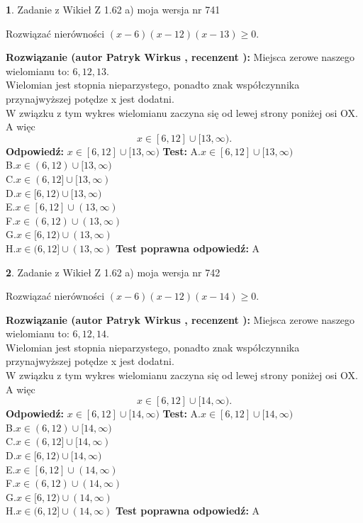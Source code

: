 \documentclass[12pt, a4paper]{article}
\theoremstyle{definition} %
\newtheorem{zad}{}
\newcommand{\zadStart}[1]{\begin{zad}#1\newline}
\newcommand{\zadStop}{\end{zad}}
\newcommand{\rozwStart}[2]{\noindent \textbf{Rozwiązanie (autor #1 , recenzent #2): }\newline}
\newcommand{\rozwStop}{\newline}
\newcommand{\odpStart}{\noindent \textbf{Odpowiedź:}\newline}
\newcommand{\odpStop}{\newline}
\newcommand{\testStart}{\noindent \textbf{Test:}\newline}
\newcommand{\testStop}{\newline}
\newcommand{\kluczStart}{\noindent \textbf{Test poprawna odpowiedź:}\newline}
\newcommand{\kluczStop}{\newline}
\begin{document}
\zadStart{Zadanie z Wikieł Z 1.62 a) moja wersja nr 741}

Rozwiązać nierówności $(x-6)(x-12)(x-13)\ge0$.
\zadStop
\rozwStart{Patryk Wirkus}{}
Miejsca zerowe naszego wielomianu to: $6, 12, 13$.\\
Wielomian jest stopnia nieparzystego, ponadto znak współczynnika przy\linebreak najwyższej potędze x jest dodatni.\\ W związku z tym wykres wielomianu zaczyna się od lewej strony poniżej osi OX. A więc $$x \in [6,12] \cup [13,\infty).$$
\rozwStop
\odpStart
$x \in [6,12] \cup [13,\infty)$
\odpStop
\testStart
A.$x \in [6,12] \cup [13,\infty)$\\
B.$x \in (6,12) \cup [13,\infty)$\\
C.$x \in (6,12] \cup [13,\infty)$\\
D.$x \in [6,12) \cup [13,\infty)$\\
E.$x \in [6,12] \cup (13,\infty)$\\
F.$x \in (6,12) \cup (13,\infty)$\\
G.$x \in [6,12) \cup (13,\infty)$\\
H.$x \in (6,12] \cup (13,\infty)$
\testStop
\kluczStart
A
\kluczStop



\zadStart{Zadanie z Wikieł Z 1.62 a) moja wersja nr 742}

Rozwiązać nierówności $(x-6)(x-12)(x-14)\ge0$.
\zadStop
\rozwStart{Patryk Wirkus}{}
Miejsca zerowe naszego wielomianu to: $6, 12, 14$.\\
Wielomian jest stopnia nieparzystego, ponadto znak współczynnika przy\linebreak najwyższej potędze x jest dodatni.\\ W związku z tym wykres wielomianu zaczyna się od lewej strony poniżej osi OX. A więc $$x \in [6,12] \cup [14,\infty).$$
\rozwStop
\odpStart
$x \in [6,12] \cup [14,\infty)$
\odpStop
\testStart
A.$x \in [6,12] \cup [14,\infty)$\\
B.$x \in (6,12) \cup [14,\infty)$\\
C.$x \in (6,12] \cup [14,\infty)$\\
D.$x \in [6,12) \cup [14,\infty)$\\
E.$x \in [6,12] \cup (14,\infty)$\\
F.$x \in (6,12) \cup (14,\infty)$\\
G.$x \in [6,12) \cup (14,\infty)$\\
H.$x \in (6,12] \cup (14,\infty)$
\testStop
\kluczStart
A
\kluczStop
\end{document}
